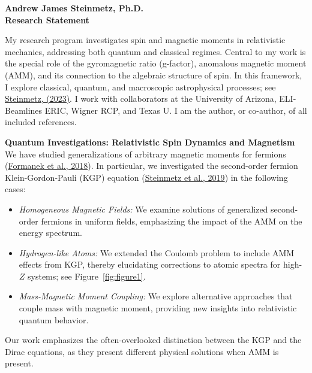 \documentclass[11pt]{article}
\begin{document}
\begin{center}
    {\Large\textbf{Andrew James Steinmetz, Ph.D.}}\\[0.5em]
    {\large\textbf{Research Statement}}
\end{center}

\noindent
My research program investigates spin and magnetic moments in relativistic mechanics, addressing both quantum and classical regimes. Central to my work is the special role of the gyromagnetic ratio (g-factor), anomalous magnetic moment (AMM), and its connection to the algebraic structure of spin. In this framework, I explore classical, quantum, and macroscopic astrophysical processes; see \href{http://hdl.handle.net/10150/670301}{Steinmetz, (2023)}. I work with collaborators at the University of Arizona, ELI-Beamlines ERIC, Wigner RCP, and Texas U. I am the author, or co-author, of all included references.

\vspace{1em}

{\noindent\Large\textbf{Quantum Investigations: Relativistic Spin Dynamics and Magnetism}}\\
We have studied generalizations of arbitrary magnetic moments for fermions (\href{https://doi.org/10.1088/1361-6587/aac06a}{Formanek et al., 2018}). In particular, we investigated the second-order fermion Klein-Gordon-Pauli (KGP) equation (\href{https://doi.org/10.1140/epja/i2019-12715-5}{Steinmetz et al., 2019}) in the following cases:
\begin{itemize}[leftmargin=1.5em,nosep]
    \item \emph{Homogeneous Magnetic Fields:} We examine solutions of generalized second-order fermions in uniform fields, emphasizing the impact of the AMM on the energy spectrum.
    \item \emph{Hydrogen-like Atoms:} We extended the Coulomb problem to include AMM effects from KGP, thereby elucidating corrections to atomic spectra for high-\(Z\) systems; see Figure~\ref{fig:figure1}.
    \item \emph{Mass-Magnetic Moment Coupling:} We explore alternative approaches that couple mass with magnetic moment, providing new insights into relativistic quantum behavior.
\end{itemize}
Our work emphasizes the often-overlooked distinction between the KGP and the Dirac equations, as they present different physical solutions when AMM is present.

\vspace{1em}
\end{document}
